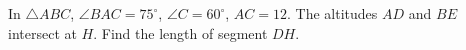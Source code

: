 In $\triangle ABC$, $\angle BAC = 75^\circ$, $\angle C = 60^\circ$, $AC = 12$. The altitudes $AD$ and $BE$ intersect at $H$. Find the length of segment $DH$.
